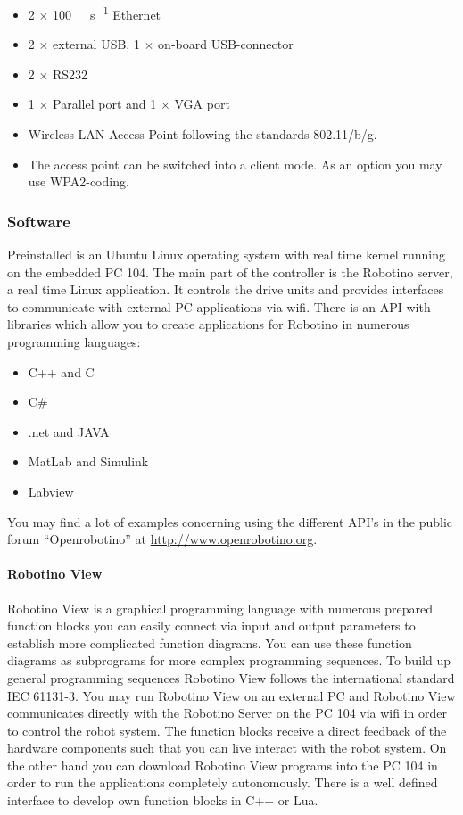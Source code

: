 \documentclass[12pt,twoside]{article}
\begin{document}
\begin{appendix}
\begin{itemize}
\item 2 $\times$ \SI[per-mode=symbol]{100}{\mega\bit\per\second} Ethernet
\item 2 $\times$ external USB, 1 $\times$ on-board USB-connector
\item 2 $\times$  RS232
\item 1 $\times$ Parallel port and 1 $\times$ VGA port
\item Wireless LAN Access Point following the standards 802.11/b/g.
\item The access point can be switched into a client mode.  As an
  option you may use WPA2-coding.
\end{itemize}

\subsubsection{Software}
Preinstalled is an Ubuntu Linux operating system with real time kernel
running on the embedded PC 104. The main part of the controller is the
Robotino server, a real time Linux application. It controls the drive
units and provides interfaces to communicate with external PC
applications via wifi. There is an API with libraries which allow you
to create applications for Robotino in numerous programming languages:

\begin{itemize}
	\item C++ and C 
	\item C\# 
	\item .net and JAVA 
	\item MatLab and Simulink
	\item Labview
\end{itemize}

You may find a lot of examples concerning using the different API's in
the public forum ``Openrobotino'' at
\url{http://www.openrobotino.org}.

\paragraph{Robotino View} 

Robotino View is a graphical programming language with numerous
prepared function blocks you can easily connect via input and output
parameters to establish more complicated function diagrams. You can use
these function diagrams as subprograms for more complex programming
sequences. To build up general programming sequences Robotino View
follows the international standard IEC 61131-3. You may run Robotino
View on an external PC and Robotino View communicates directly with
the Robotino Server on the PC 104 via wifi in order to control the
robot system. The function blocks receive a direct feedback of the
hardware components such that you can live interact with the robot
system. On the other hand you can download Robotino View programs into
the PC 104 in order to run the applications completely autonomously.
There is a well defined interface to develop own function blocks in C++
or Lua.


\end{appendix}
\end{document}
